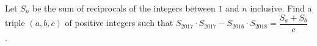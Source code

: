 Let $S_n$ be the sum of reciprocals of the integers between $1$ and $n$ inclusive. Find a triple $(a, b, c)$ of positive integers such that $S_{2017} \cdot  S_{2017} - S_{2016} \cdot S_{2018} = \dfrac{S_a+S_b}{c}$ .
